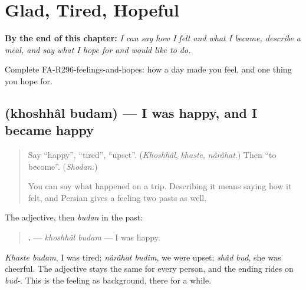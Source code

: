 
\chapter{Glad, Tired, Hopeful}
\label{ch:fa-glad-tired-hopeful}

\begin{chapteropening}
\textbf{By the end of this chapter:} \emph{I can say how I felt and what I became, describe a meal, and say what I hope for and would like to do.}

Complete FA-R296-feelings-and-hopes: how a day made you feel, and one thing you hope for.
\end{chapteropening}

\section[\texorpdfstring{\fa{خوشحال} \fa{بودم} (khoshhâl budam)}{خوشحال بودم (khoshhâl budam)}]{  (khoshhâl budam) — I was happy, and I became happy}

\label{lesson:FA-C296-khoshhal-budam}



\begin{quote}
Say \textquotedblleft{}happy\textquotedblright{}, \textquotedblleft{}tired\textquotedblright{}, \textquotedblleft{}upset\textquotedblright{}. (\emph{Khoshhâl}, \emph{khaste}, \emph{nârâhat}.) Then \textquotedblleft{}to become\textquotedblright{}. (\emph{Shodan.})

You can say what happened on a trip. Describing it means saying how it felt, and Persian gives a feeling two pasts as well.
\end{quote}

\begin{grammarlens}[title={Grammar Lens: the feeling as scene}]
The adjective, then \emph{budan} in the past:

\begin{quote}
\textbf{ .} — \emph{khoshhâl budam} — I was happy.
\end{quote}

\emph{Khaste budam}, I was tired; \emph{nârâhat budim}, we were upset; \emph{shâd bud}, she was cheerful. The adjective stays the same for every person, and the ending rides on \emph{bud-}. This is the feeling as background, there for a while.
\end{grammarlens}

